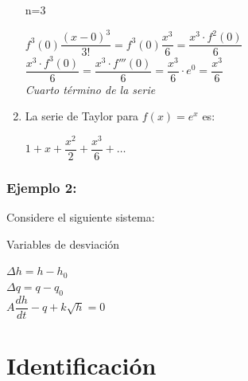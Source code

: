 \documentclass[a4paper,12pt,twoside]{proyectotanquesecci}
\begin{document}
\begin{enumerate}
	n=3
	\begin{center}
		$f^{3}\left( 0\right) \dfrac {\left( x-0\right) ^{3}}{3!}=f^{3}\left( 0\right) \dfrac {x^{3}}{6}=\dfrac {x^{3}\cdot f^{2}\left( 0\right) }{6}$\\
		$\dfrac {x^{3}\cdot f^{3}\left( 0\right) }{6}=\dfrac {x^{3}\cdot f'''\left( 0\right) }{6}=\dfrac {x^{3}}{6}\cdot e^{0}=\dfrac {x^{3}}{6}$\\
		\textit{ Cuarto término de la serie }\\
	\end{center}
	
\item La serie de Taylor para $f(x)=e^{x}$ es:
	\begin{center} $1+x+\dfrac {x^{2}}{2}+\dfrac {x^{3}}{6}+\ldots$ \end{center}
\end{enumerate}

\subsubsection{Ejemplo 2:}

Considere el siguiente sistema:

Variables de desviación

\begin{center}
	$\Delta h=h-h_{0}$\\
	$\Delta q=q-q_{0}$\\
	$A\dfrac {dh}{dt}-q+k\sqrt {h}=0$\\
\end{center}




\newpage




\section{Identificación}
\end{document}
